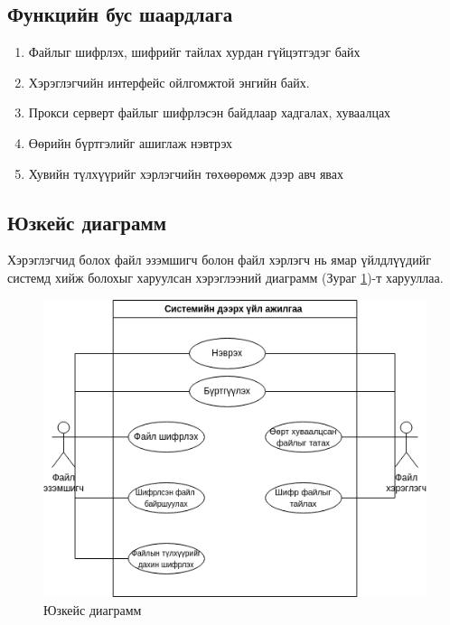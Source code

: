 \subsection*{Функцийн бус шаардлага}
\begin{enumerate}
    \item Файлыг шифрлэх, шифрийг тайлах хурдан гүйцэтгэдэг байх
    \item Хэрэглэгчийн интерфейс ойлгомжтой энгийн байх.
    \item Прокси серверт файлыг шифрлэсэн байдлаар хадгалах, хуваалцах
    \item Өөрийн бүртгэлийг ашиглаж нэвтрэх
    \item Хувийн түлхүүрийг хэрлэгчийн төхөөрөмж дээр авч явах
\end{enumerate}

\subsection*{Юзкейс диаграмм}
Хэрэглэгчид болох файл эзэмшигч болон файл хэрлэгч нь ямар үйлдлүүдийг системд хийж болохыг харуулсан хэрэглээний диаграмм (Зураг \ref{fig:usecase})-т харууллаа.

\begin{figure}[H]
    \centering
    \includegraphics[scale=0.6]{Figures/system_schemes/usecase.drawio.png}
    \caption[Usecase diagram]{Юзкейс диаграмм}
    \label{fig:usecase}
\end{figure}

